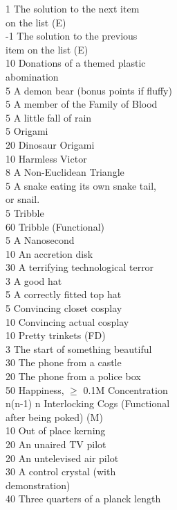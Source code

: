 \begin{multicols}{2}
\begin{tabbing}
1   \> The solution to the next item \\ \> on the list (E) \\
-1  \> The solution to the previous \\ \> item on the list (E)\\
10  \> Donations of a themed plastic \\ \> abomination \\
5   \> A demon bear (bonus points if fluffy) \\
5   \> A member of the Family of Blood \\
5   \> A little fall of rain \\
5	\> Origami \\
20  \> Dinosaur Origami \\
10  \> Harmless Victor \\
8	\> A Non-Euclidean Triangle \\
5   \> A snake eating its own snake tail, \\ \> or snail.\\
5	\> Tribble \\
60	\> Tribble (Functional) \\
5	\> A Nanosecond \\
10  \> An accretion disk \\
30  \> A terrifying technological terror \\
3	\> A good hat \\
5	\> A correctly fitted top hat \\
5   \> Convincing closet cosplay \\
10  \> Convincing actual cosplay \\
10  \> Pretty trinkets (FD) \\
3   \> The start of something beautiful \\
30   \> The phone from a castle \\
20  \> The phone from a police box \\
50	\> Happiness, $\ge$ 0.1M Concentration \\
n(n-1)	\> n Interlocking Cogs (Functional \\ \> after being poked) (M) \\
10   \> Out of place kerning \\
20   \> An unaired TV pilot \\
20   \> An untelevised air pilot \\
30 	\> A control crystal (with \\ \> demonstration) \\
40 	\> Three quarters of a planck length \\

\end{tabbing}
\end{multicols}

